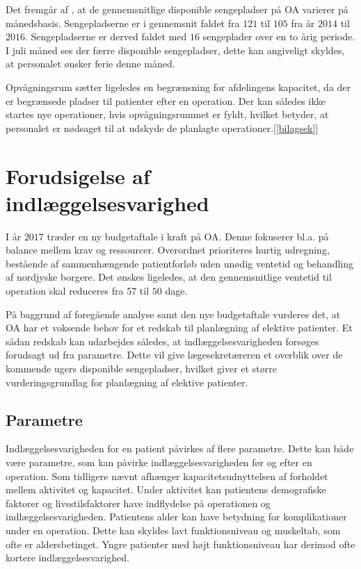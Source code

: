 \noindent
Det fremgår af , at de gennemsnitlige disponible sengepladser på OA varierer på månedsbasis. Sengepladserne er i gennemsnit faldet fra $121$ til $105$ fra år $2014$ til $2016$. Sengepladserne er derved faldet med $16$ sengeplader over en to årig periode. I juli måned ses der færre disponible sengepladser, dette kan angiveligt skyldes, at personalet ønsker ferie denne måned. 

Opvågningsrum sætter ligeledes en begrænsning for afdelingens kapacitet, da der er begrænsede pladser til patienter efter en operation. Der kan således ikke startes nye operationer, hvis opvågningsrummet er fyldt, hvilket betyder, at personalet er nødsaget til at udskyde de planlagte operationer.[\ref{bilagsek}]

\section{Forudsigelse af indlæggelsesvarighed}
I år $2017$ træder en ny budgetaftale i kraft på OA. Denne fokuserer bl.a. på balance mellem krav og ressourcer. Overordnet prioriteres hurtig udregning, bestående af sammenhængende patientforløb uden unødig ventetid og behandling af nordjyske borgere. Det ønskes ligeledes, at den gennemsnitlige ventetid til operation skal reduceres fra $57$ til $50$ dage.\cite{Budget2016}

På baggrund af foregående analyse samt den nye budgetaftale vurderes det, at OA har et voksende behov for et redskab til planlægning af elektive patienter. Et sådan redskab kan udarbejdes således, at indlæggelsesvarigheden forsøges forudsagt ud fra parametre. Dette vil give lægesekretæreren et overblik over de kommende ugers disponible sengepladser, hvilket giver et større vurderingsgrundlag for planlægning af elektive patienter.

\subsection{Parametre}
Indlæggelsesvarigheden for en patient påvirkes af flere parametre. Dette kan både være parametre, som kan påvirke indlæggelsesvarigheden før og efter en operation. Som tidligere nævnt afhænger kapacitetsudnyttelsen af forholdet mellem aktivitet og kapacitet. Under aktivitet kan patientens demografiske faktorer og livsstilsfaktorer have indflydelse på operationen og indlæggelsesvarigheden.
Patientens alder kan have betydning for komplikationer under en operation. Dette kan skyldes lavt funktionsniveau og muskeltab, som ofte er aldersbetinget. Yngre patienter med højt funktionsniveau har derimod ofte kortere indlæggelsesvarighed.\cite{Kehlet2001, Janssen2002}

